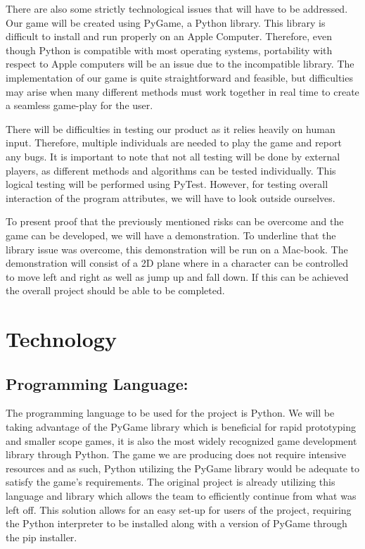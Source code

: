 \documentclass{article}
\begin{document}
There are also some strictly technological issues that will have to be
addressed. Our game will be created using PyGame, a Python library. This library
is difficult to install and run properly on an Apple Computer. Therefore, even
though Python is compatible with most operating systems, portability with
respect to Apple computers will be an issue due to the incompatible library. The
implementation of our game is quite straightforward and feasible, but
difficulties may arise when many different methods must work together in real
time to create a seamless game-play for the user.

There will be difficulties in testing our product as it relies heavily on human
input. Therefore, multiple individuals are needed to play the game and report
any bugs. It is important to note that not all testing will be done by external
players, as different methods and algorithms can be tested individually. This
logical testing will be performed using PyTest. However, for testing overall
interaction of the program attributes, we will have to look outside ourselves.

To present proof that the previously mentioned risks can be overcome and the game can
be developed, we will have a demonstration. To underline that the library issue
was overcome, this demonstration will be run on a Mac-book. The demonstration
will consist of a 2D plane where in a character can be controlled to move left
and right as well as jump up and fall down. If this can be achieved the overall
project should be able to be completed.

\section{Technology}

\subsection*{Programming Language:}

The programming language to be used for the project is Python. We will be taking
advantage of the PyGame library which is beneficial for rapid prototyping and
smaller scope games, it is also the most widely recognized game development
library through Python. The game we are producing does not require intensive
resources and as such, Python utilizing the PyGame library would be adequate to
satisfy the game’s requirements. The original project is already utilizing this
language and library which allows the team to efficiently continue from what was
left off. This solution allows for an easy set-up for users of the project,
requiring the Python interpreter to be installed along with a version of PyGame
through the pip installer.
\end{document}
